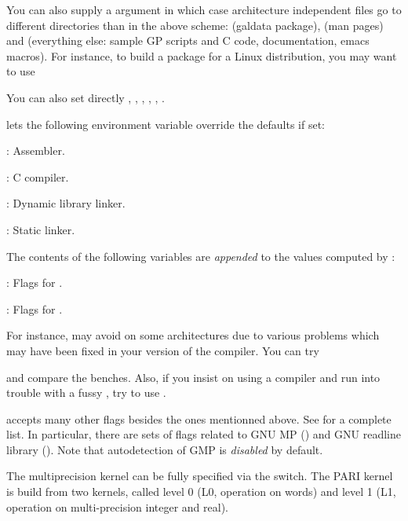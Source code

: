 \noindent You can also supply a  argument in which case
architecture independent files go to different directories than in the above
scheme:  (galdata package),  (man pages)
and  (everything else: sample GP scripts and C code,
documentation, emacs macros). For instance, to build a package for a Linux
distribution, you may want to use


\noindent You can also set directly , ,
, , , .

  lets the following
environment variable override the defaults if set:

: Assembler.

: C compiler.

: Dynamic library linker.

: Static linker.

The contents of the following variables are \emph{appended} to the
values computed by :

: Flags for .

: Flags for .


\noindent For instance,  may avoid  on some
architectures due to various problems which may have been fixed in your
version of the compiler. You can try


\noindent and compare the benches. Also, if you insist on using a 
compiler and run into trouble with a fussy , try to use
.

  accepts many other flags
besides the ones mentionned above. See  for a complete
list. In particular, there are sets of flags related to GNU MP
() and GNU readline library ().
Note that autodetection of GMP is \emph{disabled} by default.

 The multiprecision kernel can be fully
specified via the  switch. The PARI kernel is build
from two kernels, called level 0 (L0, operation on words) and level 1 (L1,
operation on multi-precision integer and real).

